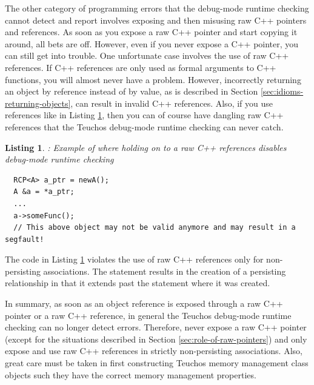 \documentclass[pdf,ps2pdf,11pt]{SANDreport}
\newtheorem{listing}{Listing}
\begin{document}

The other category of programming errors that the debug-mode runtime
checking cannot detect and report involves exposing and then misusing
raw C++ pointers and references.  As soon as you expose a raw C++
pointer and start copying it around, all bets are off.  However, even
if you never expose a C++ pointer, you can still get into trouble.
One unfortunate case involves the use of raw C++ references.  If C++
references are only used as formal arguments to C++ functions, you
will almost never have a problem.  However, incorrectly returning an
{} object by reference instead of by value, as is described
in Section {}\ref{sec:idioms-returning-objects}, can result in invalid
C++ references.  Also, if you use references like in Listing
{}\ref{listing:raw-ref-dangling-ref}, then you can of course have
dangling raw C++ references that the Teuchos debug-mode runtime
checking can never catch.

{}\begin{listing}: Example of where holding on to a raw C++ references
disables debug-mode runtime checking
\label{listing:raw-ref-dangling-ref}
{\small\begin{verbatim}
  RCP<A> a_ptr = newA();
  A &a = *a_ptr;
  ...
  a->someFunc();
  // This above object may not be valid anymore and may result in a segfault!
\end{verbatim}}
\end{listing}

The code in Listing {}\ref{listing:raw-ref-dangling-ref} violates the
use of raw C++ references only for non-persisting associations.  The
statement {} results in the creation of a
persisting relationship in that it extends past the statement where it
was created.

In summary, as soon as an object reference is exposed through a raw
C++ pointer or a raw C++ reference, in general the Teuchos debug-mode
runtime checking can no longer detect errors.  Therefore, never expose
a raw C++ pointer (except for the situations described in Section
{}\ref{sec:role-of-raw-pointers}) and only expose and use raw C++
references in strictly non-persisting associations.  Also, great care
must be taken in first constructing Teuchos memory management class
objects such they have the correct memory management properties.
\end{document}
